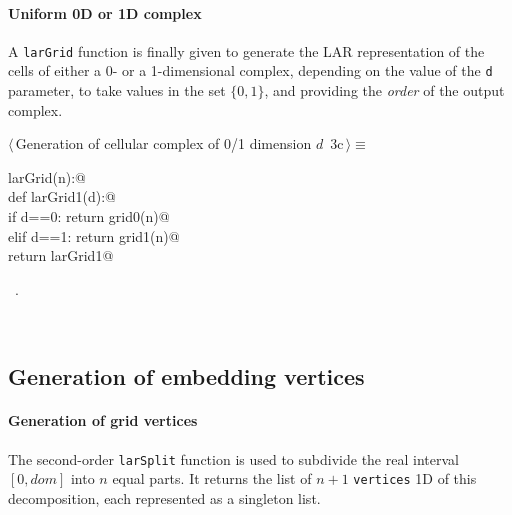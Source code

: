 \documentclass[11pt,oneside]{article}	%
\begin{document}
\paragraph{Uniform 0D or 1D complex}
A \texttt{larGrid} function is finally given to generate the LAR representation of the cells of either a 0- or a 1-dimensional complex, depending on the value of the \texttt{d} parameter, to take values in the set $\{0,1\}$, and providing the \emph{order} of the output complex.
\begin{flushleft} \small
\begin{minipage}{\linewidth} \label{scrap3}
\protect{}$\langle\,$Generation of cellular complex of 0/1 dimension $d$\nobreak\ {\footnotesize 3c}$\,\rangle\equiv$
\vspace{-1ex}
\begin{list}{}{} \item
\mbox{}\verb@def larGrid(n):@\\
\mbox{}\verb@    def larGrid1(d):@\\
\mbox{}\verb@        if d==0: return grid0(n)@\\
\mbox{}\verb@        elif d==1: return grid1(n)@\\
\mbox{}\verb@    return larGrid1@\\
\mbox{}\verb@@{\NWsep}
\end{list}
\vspace{-1ex}
\footnotesize\addtolength{\baselineskip}{-1ex}
\begin{list}{}{\setlength{\itemsep}{-\parsep}\setlength{\itemindent}{-\leftmargin}}
\item \NWtxtMacroRefIn\ .
\end{list}
\end{minipage}\\[4ex]
\end{flushleft}


\subsection{Generation of embedding vertices}

\paragraph{Generation of grid vertices}
The second-order \texttt{larSplit} function is used to subdivide the real interval $[0,dom]$ into $n$ equal parts. It returns the list of $n+1$ \texttt{vertices} 1D of this decomposition, each represented as a singleton list. 
\end{document}
